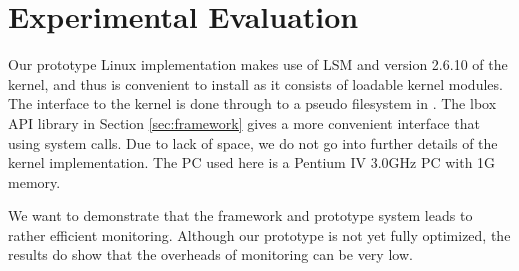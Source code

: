 \section{Experimental Evaluation}

Our prototype Linux implementation makes use of LSM \cite{lsm} and
version 2.6.10 of the kernel,
and thus is convenient to install
as it consists of loadable kernel modules.
The interface to the kernel is done through  to a pseudo filesystem
in .
The lbox API library in Section \ref{sec:framework} 
gives a more convenient interface that using  system calls.
Due to lack of space, we do not go into further details
of the kernel implementation.
The PC used here is a Pentium IV 3.0GHz PC with 1G memory.

We want to demonstrate that the framework and prototype system leads
to rather efficient monitoring. Although our prototype is not yet
fully optimized, the results do show that the overheads of monitoring
can be very low.

